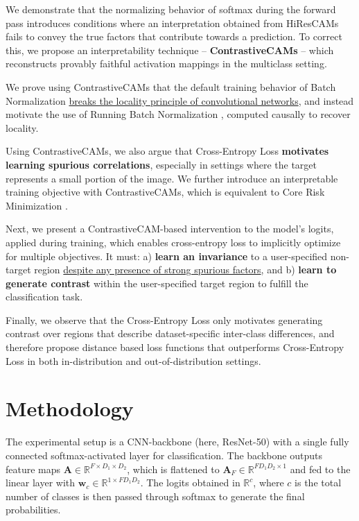 \documentclass{article}
\theoremstyle{plain}
\theoremstyle{definition}
\theoremstyle{remark}
\begin{document}
We demonstrate that the normalizing behavior of softmax during the forward pass introduces conditions where an interpretation obtained from HiResCAMs fails to convey the true factors that contribute towards a prediction. To correct this, we propose an interpretability technique -- \textbf{ContrastiveCAMs} -- which reconstructs provably faithful activation mappings in the multiclass setting.

We prove using ContrastiveCAMs that the default training behavior of Batch Normalization \citep{ioffe2015batch} \underline{breaks the locality principle of convolutional networks}, and instead motivate the use of Running Batch Normalization \citep{jermeyhowardlesson10}, computed causally to recover locality.

Using ContrastiveCAMs, we also argue that Cross-Entropy Loss \citep{cox1958regression, mao2023cross} \textbf{motivates learning spurious correlations}, especially in settings where the target represents a small portion of the image. We further introduce an interpretable training objective with ContrastiveCAMs, which is equivalent to Core Risk Minimization \citep{singla2022core}.

Next, we present a ContrastiveCAM-based intervention to the model's logits, applied during training, which enables cross-entropy loss to implicitly optimize for multiple objectives. It must: a) \textbf{learn an invariance} to a user-specified non-target region \underline{despite any presence of strong spurious factors}, and b) \textbf{learn to generate contrast} within the user-specified target region to fulfill the classification task.

Finally, we observe that the Cross-Entropy Loss only motivates generating contrast over regions that describe dataset-specific inter-class differences, and therefore propose distance based loss functions that outperforms Cross-Entropy Loss in both in-distribution and out-of-distribution settings.

\section{Methodology}

The experimental setup is a CNN-backbone (here, ResNet-50) with a single fully connected softmax-activated layer for classification. The backbone outputs feature maps $\bm{A} \in \mathbb{R}^{F \times D_1 \times D_2}$, which is flattened to $\bm{A}_F \in \mathbb{R}^{FD_1D_2 \times 1}$ and fed to the linear layer with $\bm{w}_c \in \mathbb{R}^{1 \times FD_1D_2}$. The logits obtained in $\mathbb{R}^{c}$, where $c$ is the total number of classes is then passed through softmax to generate the final probabilities.
\end{document}
